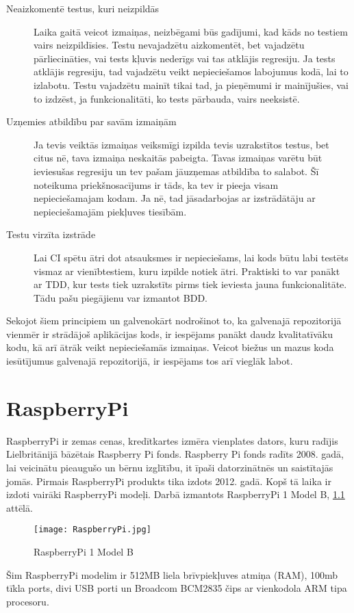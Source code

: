 \begin{description}
	\item [Neaizkomentē testus, kuri neizpildās] Laika gaitā veicot izmaiņas, neizbēgami būs gadījumi, kad kāds no testiem vairs neizpildīsies. Testu nevajadzētu aizkomentēt, bet vajadzētu pārliecināties, vai tests kļuvis nederīgs vai tas atklājis regresiju. Ja tests atklājis regresiju, tad vajadzētu veikt nepieciešamos labojumus kodā, lai to izlabotu. Testu vajadzētu mainīt tikai tad, ja pieņēmumi ir mainījušies, vai to izdzēst, ja funkcionalitāti, ko tests pārbauda, vairs neeksistē.
	\item [Uzņemies atbildību par savām izmaiņām] Ja tevis veiktās izmaiņas veiksmīgi izpilda tevis uzrakstītos testus, bet citus nē, tava izmaiņa neskaitās pabeigta. Tavas izmaiņas varētu būt ieviesušas regresiju un tev pašam jāuzņemas atbildība to salabot. Šī noteikuma priekšnosacījums ir tāds, ka tev ir pieeja visam nepieciešamajam kodam. Ja nē, tad jāsadarbojas ar izstrādātāju ar nepieciešamajām piekļuves tiesībām.
	\item [Testu virzīta izstrāde] Lai CI spētu ātri dot atsauksmes ir nepieciešams, lai kods būtu labi testēts vismaz ar vienībtestiem, kuru izpilde notiek ātri. Praktiski to var panākt ar TDD, kur tests tiek uzrakstīts pirms tiek ieviesta jauna funkcionalitāte. Tādu pašu piegājienu var izmantot BDD.
\end{description}
Sekojot šiem principiem un galvenokārt nodrošinot to, ka galvenajā repozitorijā vienmēr ir strādājoš aplikācijas kods, ir iespējams panākt daudz kvalitatīvāku kodu, kā arī ātrāk veikt nepieciešamās izmaiņas. Veicot biežus un mazus koda iesūtījumus galvenajā repozitorijā, ir iespējams tos arī vieglāk labot.


\chapter{RaspberryPi}
RaspberryPi ir zemas cenas, kredītkartes izmēra vienplates dators, kuru radījis Lielbritānijā bāzētais Raspberry Pi fonds. Raspberry Pi fonds radīts 2008. gadā, lai veicinātu pieaugušo un bērnu izglītību, it īpaši datorzinātnēs un saistītajās jomās. Pirmais RaspberryPi produkts tika izdots 2012. gadā. Kopš tā laika ir izdoti vairāki RaspberryPi modeļi. Darbā izmantots RaspberryPi 1 Model B, \ref{fig:RaspberryPi} attēlā.
\cite{raspberryHelp}
\begin{figure}[H]%
	\centering
	\captionsetup{justification=centering}
	\texttt{[image: RaspberryPi.jpg]}
	\caption{RaspberryPi 1 Model B}
	\label{fig:RaspberryPi}
\end{figure}
Šim RaspberryPi modelim ir 512MB liela brīvpiekļuves atmiņa (RAM), 100mb tīkla ports, divi USB porti un Broadcom BCM2835 čips ar vienkodola ARM tipa procesoru.

